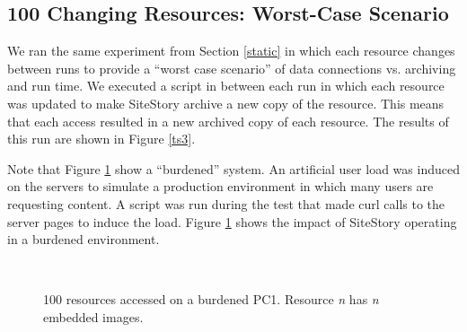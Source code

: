 \documentclass[runningheads,a4paper]{llncs}
\begin{document}
\subsection{100 Changing Resources: Worst-Case Scenario}
\label{changes}
\vskip -3mm
We ran the same experiment from Section \ref{static} in which each resource changes between runs to provide a ``worst case scenario'' of data connections vs. archiving and run time. We executed a script in between each run in which each resource was updated to make SiteStory archive a new copy of the resource. This means that each access resulted in a new archived copy of each resource. The results of this run are shown in Figure \ref{ts3}. 


Note that Figure \ref{pc1002} show a  ``burdened'' system. An artificial user load was induced on the servers to simulate a production environment in which many users are requesting content. A script was run during the test that made curl calls to the server pages to induce the load. Figure \ref{pc1002} shows the impact of SiteStory operating in a burdened environment. 


\begin{figure}[ht]
  \begin{center}
     \\
  \end{center}
  \caption{100 resources accessed on a burdened PC1. Resource \emph{n} has \emph{n} embedded images.}
  \label{pc1002}
\end{figure}
\end{document}
